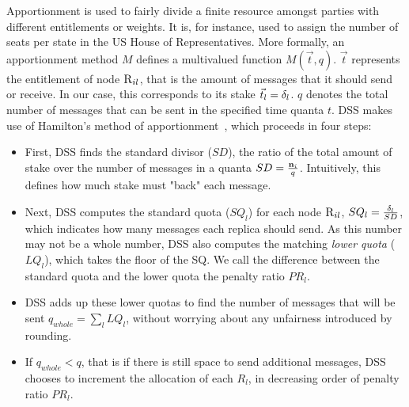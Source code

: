 Apportionment is used to fairly divide a finite resource amongst parties with different entitlements or weights. It is, for instance, used to assign the number of seats per state in the US House of Representatives. More formally, an apportionment method $M$ defines a multivalued function $M(\vec{t},q)$. $\vec{t}$ represents the entitlement of node $\textsc{R}_{{i}{l}}$, that is the amount of messages that it should send or receive. In our case, this corresponds to its stake $\vec{t}_l={\delta}_{l}$. %
$q$ denotes the total number of messages that can be sent in the specified time quanta $t$.  DSS makes use of Hamilton's method of apportionment~\cite{apportionment,apportionment-math}, which proceeds in four steps: 
\begin{itemize}[nosep,wide]
    \item First, DSS finds the standard divisor ($SD$), the ratio of the total amount of stake over the number of messages in a quanta $SD = \frac{\textbf{n}_{i}}{q}$. Intuitively, this defines how much stake must "back" each message. 
   \item Next, DSS computes the standard quota ($SQ_l$) for each node $\textsc{R}_{{i}{l}}$, $SQ_l = \frac{{\delta}_{l}}{SD}$, which indicates how many messages each replica should send. As this number may not be a whole number, DSS also computes the matching \textit{lower quota} ($LQ_l$), which takes the floor of the SQ.  We call the difference between the standard quota and the lower quota the penalty ratio $PR_l$.
   \item DSS adds up these lower quotas to find the number of messages that will be sent $q_{whole} = \sum_l{LQ_l}$, without worrying about any unfairness introduced by rounding.
    \item If $q_{whole} < q$, that is if there is still space to send additional messages, DSS chooses to increment the allocation of each $R_l$, in decreasing order of penalty ratio $PR_l$.
\end{itemize}

